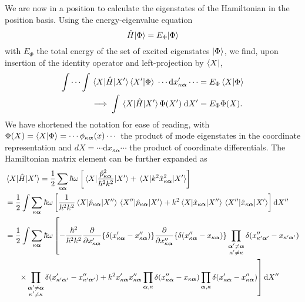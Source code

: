 \documentclass{article}
\numberwithin{equation}{section}
\begin{document}
We are now in a position to calculate the eigenstates of the Hamiltonian in the position basis. Using the energy-eigenvalue equation
\begin{equation}\label{eq:energyEigenvalue1}
\hat{H}|{\Phi}\rangle = E_\Phi|{\Phi}\rangle
\end{equation}
with $E_\Phi$ the total energy of the set of excited eigenstates $|{\Phi}\rangle$, we find, upon insertion of the identity operator and left-projection by $\langle{X}|$,
\begin{equation}\label{eq:energyEigenvalueProjection}
\begin{split}
\int\cdots\int\mel{X}{\hat{H}}{X'}\braket{X'}{\Phi}\;\cdots\mathrm{d}x'_{\kappa\bm{\alpha}}\cdots &= E_\Phi\braket{X}{\Phi}\\
\implies\int\mel{X}{\hat{H}}{X'}\Phi(X')\;\mathrm{d}X' &= E_\Phi\Phi(X).
\end{split}
\end{equation}
We have shortened the notation for ease of reading, with $\Phi(X) = \braket{X}{\Phi} = \cdots\phi_{\kappa\bm{\alpha}}(x)\cdots$ the product of mode eigenstates in the coordinate representation and $dX = \cdots\mathrm{d}x_{\kappa\bm{\alpha}}\cdots$ the product of coordinate differentials. The Hamiltonian matrix element can be further expanded as
\begin{equation}
\begin{split}
&\mel{X}{\hat{H}}{X'} = \frac{1}{2}\sum_{\kappa\bm{\alpha}}\hbar\omega\left[\mel{X}{\frac{\hat{p}^2_{\kappa\bm{\alpha}}}{\hbar^2k^2}}{X'} + \mel{X}{k^2\hat{x}^2_{\kappa\bm{\alpha}}}{X'}\right]\\
&= \frac{1}{2}\int\sum_{\kappa\bm{\alpha}}\hbar\omega\left[\frac{1}{\hbar^2k^2}\mel{X}{\hat{p}_{\kappa\bm{\alpha}}}{X''}\mel{X''}{\hat{p}_{\kappa\bm{\alpha}}}{X'} + k^2\mel{X}{\hat{x}_{\kappa\bm{\alpha}}}{X''}\mel{X''}{\hat{x}_{\kappa\bm{\alpha}}}{X'}\right]\mathrm{d}X''\\
&= \frac{1}{2}\int\sum_{\kappa\bm{\alpha}}\hbar\omega\left[-\frac{\hbar^2}{\hbar^2k^2}\frac{\partial}{\partial x'_{\kappa\bm{\alpha}}}\{\delta(x'_{\kappa\bm{\alpha}} - x''_{\kappa\bm{\alpha}})\}\frac{\partial}{\partial x''_{\kappa\bm{\alpha}}}\{\delta(x''_{\kappa\bm{\alpha}} - x_{\kappa\bm{\alpha}})\} \vphantom{\prod_{\substack{\bm{\alpha}'\neq\bm{\alpha}\\\kappa'\neq\kappa}}}\prod_{\substack{\bm{\alpha}'\neq\bm{\alpha}\\\kappa'\neq\kappa}}\delta(x''_{\kappa'\bm{\alpha}'} - x_{\kappa'\bm{\alpha}'}) \right.\\
&\hspace{0.05\textwidth}\left.\times\prod_{\substack{\bm{\alpha}'\neq\bm{\alpha}\\\kappa'\neq\kappa}}\delta(x'_{\kappa'\bm{\alpha}'} - x''_{\kappa'\bm{\alpha}'}) + k^2x'_{\kappa\bm{\alpha}}x''_{\kappa\bm{\alpha}}\prod_{\bm{\alpha},\kappa}\delta(x''_{\kappa\bm{\alpha}} - x_{\kappa\bm{\alpha}})\prod_{\bm{\alpha},\kappa}\delta(x'_{\kappa\bm{\alpha}} - x''_{\kappa\bm{\alpha}})\right]\mathrm{d}X''
\end{split}
\end{equation}
\end{document}

